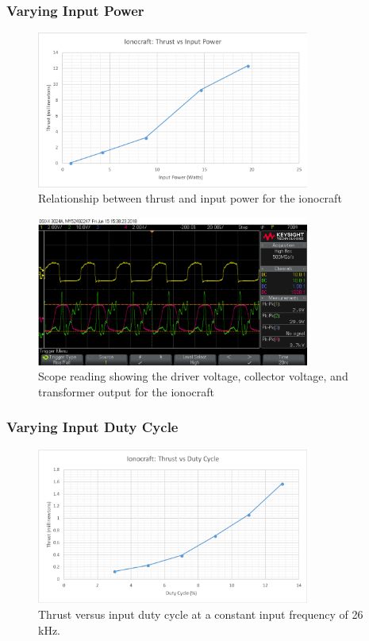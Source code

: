\documentclass[11pt]{article}
\begin{document}
\subsubsection{Varying Input Power}

\begin{figure}[h!]
\centering
\includegraphics[width = 0.8\textwidth]{craft_g1}
\caption{\label{fig:craft_g1} Relationship between thrust and input power for the ionocraft}
\end{figure}

\begin{figure}[h!]
\centering
\includegraphics[width = 0.8\textwidth]{craft_sc_1}
\caption{\label{fig:craft_sc_1} Scope reading showing the driver voltage, collector voltage, and transformer output for the ionocraft}
\end{figure}

\pagebreak
\subsubsection{Varying Input Duty Cycle}

\begin{figure}[h!]
\centering
\includegraphics[width = 0.8\textwidth]{craft_g2}
\caption{\label{fig:craft_g2} Thrust versus input duty cycle at a constant input frequency of 26 kHz.}
\end{figure}
\end{document}
